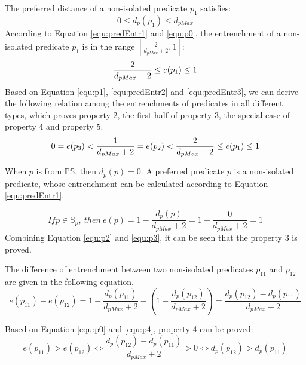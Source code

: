 \documentclass[11pt,letterpaper]{article}
\newcommand{\ps}{\mathbb{PS}}
\begin{document}
The preferred distance of a non-isolated predicate $p_{1}$ satisfies:
\begin{equation}\label{equ:p0}
  0 \leq d_{p}(p_{1}) \leq d_{pMax}
\end{equation}
According to Equation \ref{equ:predEntr1} and  \ref{equ:p0},  the entrenchment of a non-isolated predicate $p_{1}$ is in the range $[\frac{2}{d_{pMax}+2}, 1]$: 
\begin{equation}\label{equ:p1}
    \frac{2}{d_{pMax}+2} \leq e(p_{1})\leq  1 \\
\end{equation}
Based on Equation \ref{equ:p1}, \ref{equ:predEntr2} and \ref{equ:predEntr3}, we can derive the following relation among the entrenchments of predicates in all different types, which proves  property 2, the first half of  property 3, the special case of  property 4 and  property 5.
\begin{equation}\label{equ:p2}
    0= e(p_{3}) < \frac{1}{d_{pMax}+2}= e(p_{2}) < \frac{2}{d_{pMax}+2} \leq e(p_{1})\leq  1 \\
\end{equation}

 When $p$ is from $\ps$, then $d_{p}(p) = 0$. A preferred predicate $p$ is a non-isolated predicate, whose entrenchment can be calculated according to Equation \ref{equ:predEntr1}.
 
 \begin{equation}\label{equ:p3}
   If p \in \mathbb{S}_{p},\ then\  e(p) =1- \frac{d_{p}(p)}{d_{pMax}+2} = 1 - \frac{0}{d_{pMax}+2} =1
 \end{equation}
Combining Equation \ref{equ:p2} and \ref{equ:p3}, it can be seen that the property 3 is  proved. 

The difference of entrenchment between two non-isolated predicates $p_{11}$ and $p_{12}$ are given in the following equation.
 \begin{equation}\label{equ:p4}
   e(p_{11}) - e(p_{12}) =1- \frac{d_{p}(p_{11})}{d_{pMax}+2} - (1- \frac{d_{p}(p_{12})}{d_{pMax}+2}) = \frac{d_{p}(p_{12}) - d_{p}(p_{11})}{d_{pMax}+2}
 \end{equation}

Based on Equation \ref{equ:p0} and \ref{equ:p4}, property 4 can be proved:
 \begin{equation}\label{equ:p5}
 e(p_{11}) > e(p_{12}) \Leftrightarrow \frac{d_{p}(p_{12}) - d_{p}(p_{11})}{d_{pMax}+2} > 0 \Leftrightarrow d_{p}(p_{12}) > d_{p}(p_{11})
 \end{equation}
\end{document}

